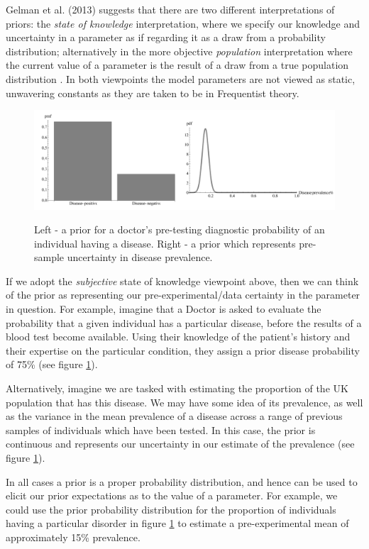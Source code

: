 \documentclass[11pt,fullpage]{book}
\begin{document}
Gelman et al. (2013) suggests that there are two different interpretations of priors: the \textit{state of knowledge} interpretation, where we specify our knowledge and uncertainty in a parameter as if regarding it as a draw from a probability distribution; alternatively in the more objective \textit{population} interpretation where the current value of a parameter is the result of a draw from a true population distribution \cite{gelman2013bayesian}. In both viewpoints the model parameters are not viewed as static, unwavering constants as they are taken to be in Frequentist theory.

\begin{figure}
\centering
\scalebox{0.3} 
{\includegraphics{Prior_introduction.pdf}}
\caption{Left - a prior for a doctor's pre-testing diagnostic probability of an individual having a disease. Right - a prior which represents pre-sample uncertainty in disease prevalence.}\label{fig:Prior_introduction}
\end{figure}

If we adopt the \textit{subjective} state of knowledge viewpoint above, then we can think of the prior as representing our pre-experimental/data certainty in the parameter in question. For example, imagine that a Doctor is asked to evaluate the probability that a given individual has a particular disease, before the results of a blood test become available. Using their knowledge of the patient's history and their expertise on the particular condition, they assign a prior disease probability of 75\% (see figure \ref{fig:Prior_introduction}). 

Alternatively, imagine we are tasked with estimating the proportion of the UK population that has this disease. We may have some idea of its prevalence, as well as the variance in the mean prevalence of a disease across a range of previous samples of individuals which have been tested. In this case, the prior is continuous and represents our uncertainty in our estimate of the prevalence (see figure \ref{fig:Prior_introduction}). 

In all cases a prior is a proper probability distribution, and hence can be used to elicit our prior expectations as to the value of a parameter. For example, we could use the prior probability distribution for the proportion of individuals having a particular disorder in figure \ref{fig:Prior_introduction} to estimate a pre-experimental mean of approximately 15\% prevalence. 
\end{document}
